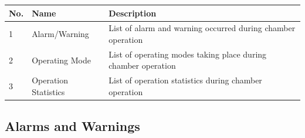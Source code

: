 \begin{longtable}[]{@{}|l|l|l|@{}}
\toprule
\rowcolor{brown}\begin{minipage}[b]{0.04\columnwidth}\raggedright
{\bf{No.}}\strut
\end{minipage} & \begin{minipage}[b]{0.23\columnwidth}\raggedright
{\bf{Name}}\strut
\end{minipage} & \begin{minipage}[b]{0.65\columnwidth}\raggedright
{\bf{Description}}\strut
\end{minipage}\tabularnewline
\midrule
\endhead
\begin{minipage}[t]{0.04\columnwidth}\raggedright
1\strut
\end{minipage} & \begin{minipage}[t]{0.23\columnwidth}\raggedright
Alarm/Warning\strut
\end{minipage} & \begin{minipage}[t]{0.65\columnwidth}\raggedright
List of alarm and warning occurred during chamber operation\strut
\end{minipage}\tabularnewline
\begin{minipage}[t]{0.04\columnwidth}\raggedright
2\strut
\end{minipage} & \begin{minipage}[t]{0.23\columnwidth}\raggedright
Operating Mode\strut
\end{minipage} & \begin{minipage}[t]{0.65\columnwidth}\raggedright
List of operating modes taking place during chamber operation\strut
\end{minipage}\tabularnewline
\begin{minipage}[t]{0.04\columnwidth}\raggedright
3\strut
\end{minipage} & \begin{minipage}[t]{0.23\columnwidth}\raggedright
Operation Statistics\strut
\end{minipage} & \begin{minipage}[t]{0.65\columnwidth}\raggedright
List of operation statistics during chamber operation\strut
\end{minipage}\tabularnewline
\bottomrule
\end{longtable}


\pagebreak
\subsection{Alarms and Warnings}


